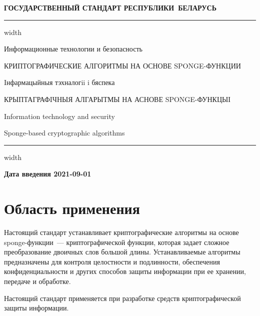 \newpage
\setcounter{page}{1}
\pagestyle{headings}

\begin{center}
{\bfseries
ГОСУДАРСТВЕННЫЙ СТАНДАРТ РЕСПУБЛИКИ~БЕЛАРУСЬ
\vskip 2pt
\hrule width\textwidth

\vskip 9pt

Информационные технологии и безопасность

КРИПТОГРАФИЧЕСКИЕ АЛГОРИТМЫ НА ОСНОВЕ SPONGE-ФУНКЦИИ

\vskip 9pt

Iнфармацыйныя тэхналогii i бяспека

КРЫПТАГРАФIЧНЫЯ АЛГАРЫТМЫ НА АСНОВЕ SPONGE-ФУНКЦЫІ
} %

\vskip 9pt

Information technology and security

Sponge-based cryptographic algorithms

\vskip 4pt                
\hrule width \textwidth
\end{center}

\mbox{}\hfill{\bfseries Дата введения 2021-09-01}

\chapter{Область применения}

Настоящий стандарт устанавливает криптографические алгоритмы на основе
sponge-функции~--- криптографической функции, которая задает сложное 
преобразование двоичных слов большой длины. Устанавливаемые алгоритмы 
предназначены для контроля целостности и подлинности, обеспечения 
конфиденциальности и других способов защиты информации при ее хранении, 
передаче и обработке.

Настоящий стандарт применяется при разработке 
средств криптографической защиты информации.

